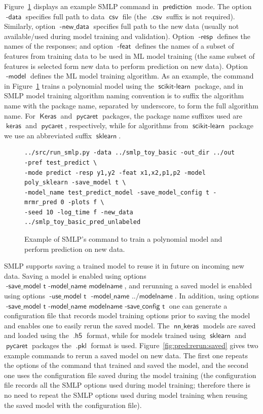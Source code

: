 \documentclass[a4paper,parskip=half]{article} %
\newcommand*\option[1]{\operatorname{\mathsf{#1}}} %
\newcommand*\suffix[1]{\operatorname{\mathsf{#1}}} %
\newcommand*\mode[1]{\operatorname{\mathsf{#1}}} %
\newcommand*\package[1]{\operatorname{\mathsf{#1}}} %
\begin{document}
Figure~\ref{fig:pred:command} displays an example SMLP command in $\mode{prediction}$ mode.
The option $\option{-data}$ specifies full path to data $\suffix{csv}$ file (the $\suffix{.csv}$ suffix is not required).
Similarly, option $\option{-new\_data}$ specifies full path to the new data (usually not available/used during model training and validation).
Option $\option{-resp}$ defines the names of the responses;
and option $\option{-feat}$ defines the names of a subset of features from training data to be used in ML model training
(the same subset of features is selected form new data to perform prediction on new data).
Option $\option{-model}$ defines the ML model training algorithm. As an example, the command in Figure~\ref{fig:pred:command}
trains a polynomial model using the $\package{scikit-learn}$ package, and in SMLP model training algorithm naming convention is to
suffix the algorithm name with the package name, separated by underscore,  to form the full algorithm name.
For $\package{Keras}$ and $\package{pycaret}$ packages, the package name suffixes used are $\package{keras}$ and 
$\package{pycaret}$, respectively, while for algorithms from $\package{scikit-learn}$ package we use an 
abbreviated suffix $\package{sklearn}$.
\begin{figure}%
\begin{verbatim}
../src/run_smlp.py -data ../smlp_toy_basic -out_dir ../out -pref test_predict \
-mode predict -resp y1,y2 -feat x1,x2,p1,p2 -model poly_sklearn -save_model t \ 
-model_name test_predict_model -save_model_config t -mrmr_pred 0 -plots f \
-seed 10 -log_time f -new_data ../smlp_toy_basic_pred_unlabeled  

\end{verbatim}
\caption{Example of SMLP's command  to train a polynomial model and perform prediction on new data.}
\label{fig:pred:command}
\end{figure}

SMLP supports saving a trained model to reuse it in future on incoming new data. 
Saving a model is enabled using options $\option{-save\_model\,\, t\,\,-model\_name \,\,modelname}$,
and rerunning a saved model is enabled using options $\option{-use\_model\,\, t\ \,\,-model\_name \,\,../modelname}$.
In addition, using options $\option{-save\_model\,\, t\,\,-model\_name \,\,modelname\,\, -save\_config\,\, t}$ 
one can generate a configuration file that records model training options prior to saving the model and  enables one 
to easily rerun the saved model. The $\option{nn\_keras}$ models are saved and loaded using the $\suffix{.h5}$
format, while for models trained using $\package{sklearn}$ and $\package{pycaret}$ packages the  $\option{.pkl}$ format 
 is used. Figure~\ref{fig:pred:rerun:saved} gives two example commands to rerun a saved model on new data.
The first one repeats the options of the command that trained and saved the model, and the second
one uses the configuration file saved during the model training (the configuration file records all the SMLP options
used during model training; therefore there is no need to repeat the SMLP options used during model training
when reusing the saved model with the configuration file). 
\end{document}
